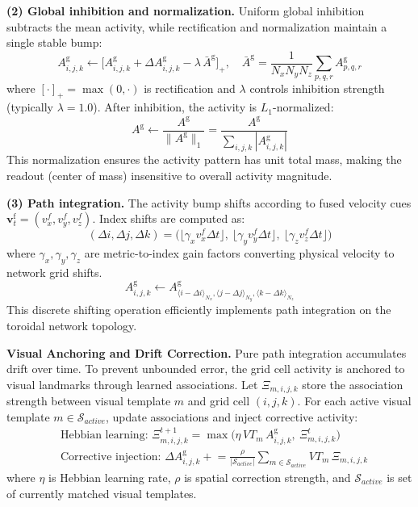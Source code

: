\textbf{(2) Global inhibition and normalization.} Uniform global inhibition subtracts the mean activity, while rectification and normalization maintain a single stable bump:
\begin{equation}
    A^\mathrm{g}_{i,j,k}\leftarrow \big[A^\mathrm{g}_{i,j,k}+\Delta A^\mathrm{g}_{i,j,k}-\lambda\,\bar A^\mathrm{g}\big]_+,\quad \bar A^\mathrm{g}=\frac{1}{N_xN_yN_z}\sum_{p,q,r}A^\mathrm{g}_{p,q,r}
\end{equation}
where $[\cdot]_+ = \max(0, \cdot)$ is rectification and $\lambda$ controls inhibition strength (typically $\lambda=1.0$). After inhibition, the activity is $L_1$-normalized:
\begin{equation}
    A^\mathrm{g}\leftarrow \frac{A^\mathrm{g}}{\lVert A^\mathrm{g}\rVert_1}=\frac{A^\mathrm{g}}{\sum_{i,j,k}|A^\mathrm{g}_{i,j,k}|}
\end{equation}
This normalization ensures the activity pattern has unit total mass, making the readout (center of mass) insensitive to overall activity magnitude.

\textbf{(3) Path integration.} The activity bump shifts according to fused velocity cues $\mathbf{v}^\mathrm{f}_t = (v^f_x, v^f_y, v^f_z)$. Index shifts are computed as:
\begin{equation}
    (\Delta i,\Delta j,\Delta k)=\big(\lfloor \gamma_x v^f_x\Delta t\rfloor,\ \lfloor \gamma_y v^f_y\Delta t\rfloor,\ \lfloor \gamma_z v^f_z\Delta t\rfloor\big)
\end{equation}
where $\gamma_x,\gamma_y,\gamma_z$ are metric-to-index gain factors converting physical velocity to network grid shifts.
\begin{equation}
    A^\mathrm{g}_{i,j,k}\leftarrow A^\mathrm{g}_{\langle i-\Delta i\rangle_{N_x},\langle j-\Delta j\rangle_{N_y},\langle k-\Delta k\rangle_{N_z}}
\end{equation}
This discrete shifting operation efficiently implements path integration on the toroidal network topology.

\textbf{Visual Anchoring and Drift Correction.} Pure path integration accumulates drift over time. To prevent unbounded error, the grid cell activity is anchored to visual landmarks through learned associations. Let $\Xi_{m,i,j,k}$ store the association strength between visual template $m$ and grid cell $(i,j,k)$. For each active visual template $m \in \mathcal{S}_{active}$, update associations and inject corrective activity:
\begin{align}
     & \text{Hebbian learning: } \Xi_{m,i,j,k}^{t+1}=\max\big(\eta\,VT_m\,A^\mathrm{g}_{i,j,k},\ \Xi_{m,i,j,k}^{t}\big)                                             \\
     & \text{Corrective injection: } \Delta A^\mathrm{g}_{i,j,k} \mathrel{+}= \frac{\rho}{|\mathcal{S}_{active}|}\sum_{m\in\mathcal{S}_{active}}VT_m\,\Xi_{m,i,j,k}
\end{align}
where $\eta$ is Hebbian learning rate, $\rho$ is spatial correction strength, and $\mathcal{S}_{active}$ is set of currently matched visual templates.

